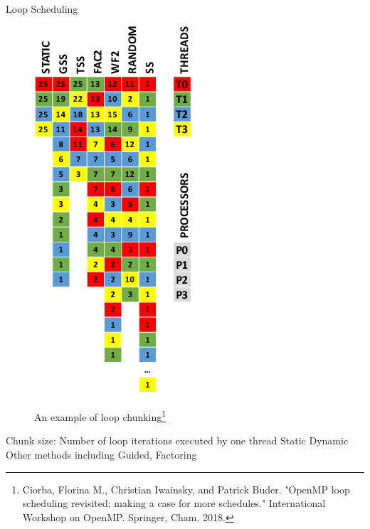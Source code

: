 \documentclass[10pt]{beamer}
\begin{document}
\begin{frame}{Loop Scheduling}
	\begin{outline}
			\begin{figure}[]
			\centering
			\includegraphics[scale=0.5]{images/loop_cropped.png}
			\caption{An example of loop chunking\footnote{Ciorba, Florina M., Christian Iwainsky, and Patrick Buder. "OpenMP loop scheduling revisited: making a case for more schedules." International Workshop on OpenMP. Springer, Cham, 2018.}}	
			\label{fig_loop}
		\end{figure}
		Chunk size: Number of loop iterations executed by one thread 
		\1Static
		\1Dynamic
		\1Other methods including Guided, Factoring
	\end{outline}
\end{frame}

%		
\end{document}
